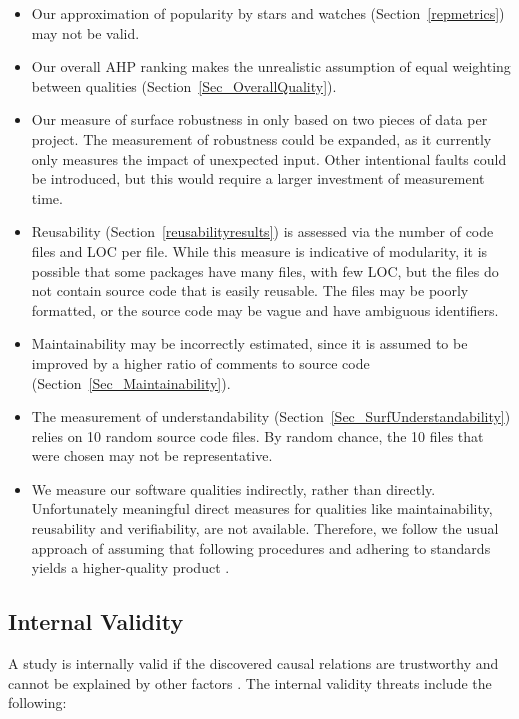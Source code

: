\documentclass[final, 3p, times, authoryear]{elsarticle}
\begin{document}
\begin{itemize}
\item Our approximation of popularity by stars and watches
(Section~\ref{repmetrics}) may not be valid. 
\item Our overall AHP ranking makes the unrealistic assumption of equal
weighting between qualities (Section~\ref{Sec_OverallQuality}).
\item Our measure of surface robustness in only based on two pieces of data per
project. The measurement of robustness could be expanded, as it currently only
measures the impact of unexpected input. Other intentional faults could be
introduced, but this would require a larger investment of measurement time. 
\item Reusability (Section~\ref{reusabilityresults}) is assessed via the number
of code files and LOC per file. While this measure is indicative of modularity,
it is possible that some packages have many files, with few LOC, but the files
do not contain source code that is easily reusable. The files may be poorly
formatted, or the source code may be vague and have ambiguous identifiers. 
\item Maintainability may be incorrectly estimated, since it is assumed to be
improved by a higher ratio of comments to source code
(Section~\ref{Sec_Maintainability}). 
\item The measurement of understandability
(Section~\ref{Sec_SurfUnderstandability}) relies on 10 random source code files.
By random chance, the 10 files that were chosen may not be representative. 
\item We measure our software qualities indirectly, rather than directly.
Unfortunately meaningful direct measures for qualities like maintainability,
reusability and verifiability, are not available.  Therefore, we follow the
usual approach of assuming that following procedures and adhering to standards
yields a higher-quality product \citep[p.\ 112]{VanVliet2000}.
\end{itemize}

\subsection{Internal Validity} \label{Sec_InternalValidity}

A study is internally valid if the discovered causal relations are trustworthy
and cannot be explained by other factors \citep{AmpatzoglouEtAl2019}. The
internal validity threats include the following:
\end{document}
